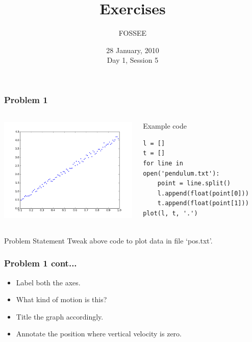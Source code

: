 \documentclass[14pt,compress]{beamer}
\title[Exercises]{Exercises}
\author[FOSSEE] {FOSSEE}
\institute[IIT Bombay] {Department of Aerospace Engineering\\IIT Bombay}
\date[] {28 January, 2010\\Day 1, Session 5}
\begin{document}
\begin{frame}
  \titlepage
\end{frame}


\begin{frame}[fragile]
  \frametitle{Problem 1}
  \begin{columns}
    \hspace*{-0.5in}
    \includegraphics[height=2in, interpolate=true]{data/L-Tsq.png}
    \begin{block}{Example code}
    \tiny
    \begin{lstlisting}
l = []
t = []
for line in open('pendulum.txt'):
    point = line.split()
    l.append(float(point[0]))
    t.append(float(point[1]))
plot(l, t, '.')
    \end{lstlisting}
    \end{block}
  \end{columns}
  \begin{block}{Problem Statement}
    Tweak above code to plot data in file `pos.txt'.
  \end{block}
\end{frame}

\begin{frame}
  \frametitle{Problem 1 cont...}
  \begin{itemize}
  \item Label both the axes.
  \item What kind of motion is this?
  \item Title the graph accordingly.
  \item Annotate the position where vertical velocity is zero.
  \end{itemize}
\end{frame}
\end{document}
